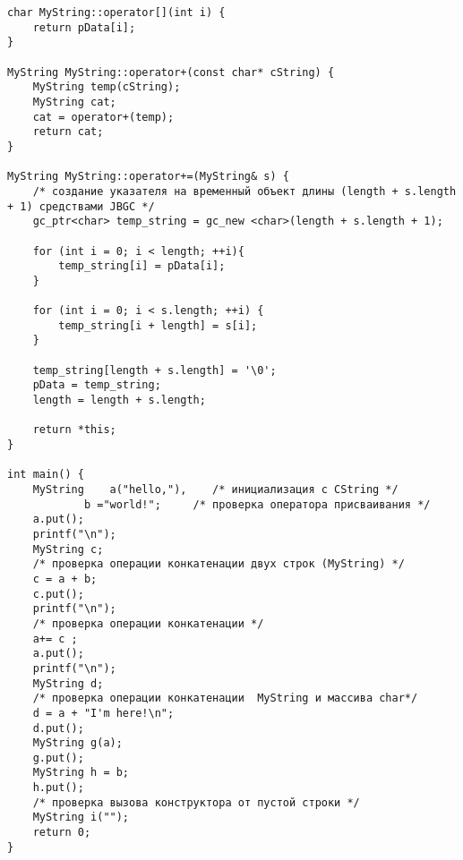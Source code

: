 \begin{lstlisting}
char MyString::operator[](int i) {
    return pData[i];
}

MyString MyString::operator+(const char* cString) {
	MyString temp(cString);
	MyString cat;
	cat = operator+(temp);
	return cat;
}

MyString MyString::operator+=(MyString& s) {
    /* создание указателя на временный объект длины (length + s.length + 1) средствами JBGC */
    gc_ptr<char> temp_string = gc_new <char>(length + s.length + 1);

    for (int i = 0; i < length; ++i){
        temp_string[i] = pData[i];
    }

    for (int i = 0; i < s.length; ++i) {
        temp_string[i + length] = s[i];
    }

    temp_string[length + s.length] = '\0';
    pData = temp_string;
    length = length + s.length;

    return *this;
}

int main() {
	MyString	a("hello,"),	/* инициализация с CString */	
			b ="world!";	 /* проверка оператора присваивания */
	a.put();
	printf("\n");	
	MyString c;		
	/* проверка операции конкатенации двух строк (MyString) */
	c = a + b;			
	c.put();
	printf("\n");	
	/* проверка операции конкатенации */
	a+= c ;	
	a.put();
	printf("\n");
	MyString d;
	/* проверка операции конкатенации  MyString и массива char*/
	d = a + "I'm here!\n";	
	d.put();
	MyString g(a);	
	g.put();	
	MyString h = b;
	h.put();
	/* проверка вызова конструктора от пустой строки */
	MyString i("");			
	return 0;
}
\end{lstlisting}
